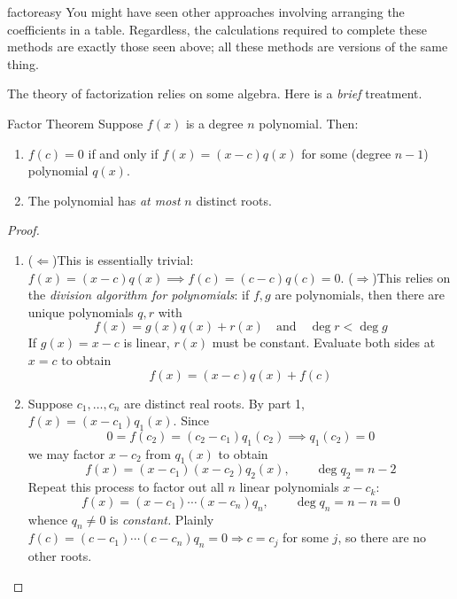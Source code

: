 \begin{example}{}{factoreasy}
	You might have seen other approaches involving arranging the coefficients in a table. Regardless, the calculations required to complete these methods are exactly those seen above; all these methods are versions of the same thing.
\end{example}


\goodbreak



The theory of factorization relies on some algebra. Here is a \emph{brief} treatment.

\begin{thm}{Factor Theorem}{}
	Suppose $f(x)$ is a degree $n$ polynomial. Then:
	\begin{enumerate}
	  \item $f(c)=0$ if and only if $f(x)=(x-c)q(x)$ for some (degree $n-1$) polynomial $q(x)$.
	  \item The polynomial has \emph{at most} $n$ distinct roots.
	\end{enumerate} 
\end{thm}

\begin{proof}
	\begin{enumerate}
	  \item ($\Leftarrow$)\lstsp This is essentially trivial: $f(x)=(x-c)q(x)\implies f(c)=(c-c)q(c)=0$.\smallbreak
		($\Rightarrow$)\lstsp This relies on the \emph{division algorithm for polynomials}: if $f,g$ are polynomials, then there are unique polynomials $q,r$ with\footnotemark{}
		\[
			f(x)=g(x)q(x)+r(x)\quad \text{and}\quad \deg r<\deg g
		\]
		If $g(x)=x-c$ is linear, $r(x)$ must be constant. Evaluate both sides at $x=c$ to obtain
		\[
			f(x)=(x-c)q(x)+f(c) \tag{thus $f(c)=0\Longrightarrow f(x)=(x-c)q(x)$}
		\]
		\item Suppose $c_1,\ldots,c_n$ are distinct real roots. By part 1, $f(x)=(x-c_1)q_1(x)$. Since
		\[
			0=f(c_2)=(c_2-c_1)q_1(c_2)\implies q_1(c_2)=0
		\]
		we may factor $x-c_2$ from $q_1(x)$ to obtain
		\[
			f(x)=(x-c_1)(x-c_2)q_2(x),\qquad \deg q_2=n-2
		\]
		Repeat this process to factor out all $n$ linear polynomials $x-c_k$:
		\[
			f(x)=(x-c_1)\cdots(x-c_n)q_n,\qquad \deg q_n=n-n=0
		\]
		whence $q_n\neq 0$ is \emph{constant.} Plainly $f(c)=(c-c_1)\cdots(c-c_n)q_n=0\Longrightarrow c=c_j$ for some $j$, so there are no other roots.\qedhere
	\end{enumerate}
\end{proof}

